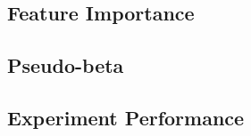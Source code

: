 \subsection{Feature Importance}
 






\subsection{Pseudo-beta}
\begin{landscape}
  
  
  
  
\end{landscape}
  

\subsection{Experiment Performance}
\clearpage
\begin{landscape}

\end{landscape}
\clearpage